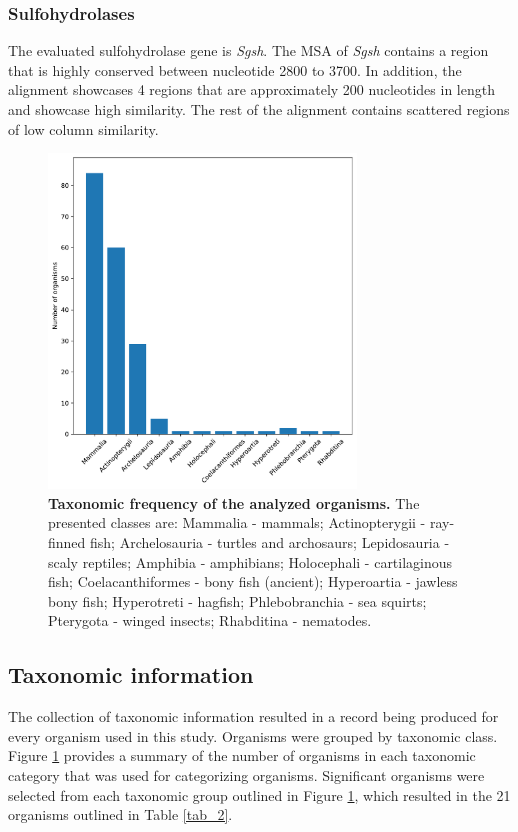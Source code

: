\documentclass{article}
\begin{document}
\subsubsection*{Sulfohydrolases}
The evaluated sulfohydrolase gene is \textit{Sgsh}. The MSA of \textit{Sgsh} contains a region that is highly conserved between nucleotide 2800 to 3700. In addition, the alignment showcases 4 regions that are approximately 200 nucleotides in length and showcase high similarity. The rest of the alignment contains scattered regions of low column similarity. 

\begin{figure}[]
\centering
\includegraphics[height=3.5in]{./images/taxa_info.pdf}
\caption{\textbf{Taxonomic frequency of the analyzed organisms.} The presented classes are: Mammalia - mammals; Actinopterygii - ray-finned fish; Archelosauria - turtles and archosaurs; Lepidosauria - scaly reptiles; Amphibia - amphibians; Holocephali - cartilaginous fish; Coelacanthiformes - bony fish (ancient); Hyperoartia - jawless bony fish; Hyperotreti - hagfish; Phlebobranchia - sea squirts; Pterygota - winged insects; Rhabditina - nematodes.}
\label{fig_2}
\end{figure}

\newpage

\subsection*{Taxonomic information}

The collection of taxonomic information resulted in a record being produced for every organism used in this study. Organisms were grouped by taxonomic class. Figure \ref{fig_2} provides a summary of the number of organisms in each taxonomic category that was used for categorizing organisms. Significant organisms were selected from each taxonomic group outlined in Figure \ref{fig_2}, which resulted in the 21 organisms outlined in Table \ref{tab_2}.
\end{document}
